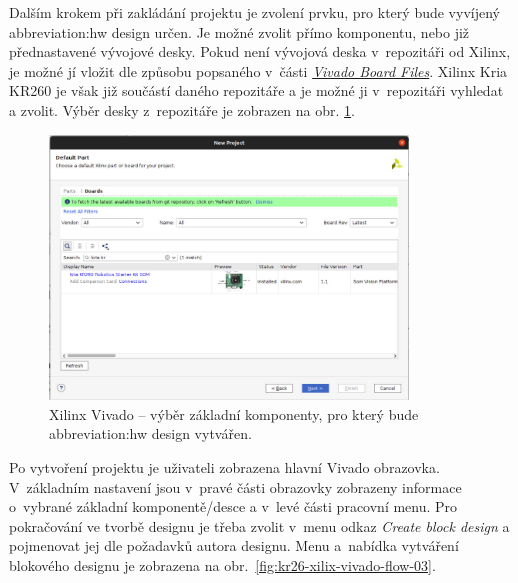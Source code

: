 \documentclass[a4paper, twoside, 11pt]{article}
\begin{document}
				Dalším krokem při zakládání projektu je zvolení prvku, pro který bude vyvíjený \gls{abbreviation:hw} design určen. Je možné zvolit přímo komponentu, nebo již přednastavené vývojové desky. Pokud není vývojová deska v~repozitáři od Xilinx, je možné jí vložit dle způsobu popsaného v~části \hyperref[subsec:vivado-board-files]{\textit{Vivado Board Files}}. Xilinx Kria KR260 je však již součástí daného repozitáře a je možné ji v~repozitáři vyhledat a zvolit. Výběr desky z~repozitáře je zobrazen na obr. \ref{fig:kr26-xilix-vivado-flow-02}.

				\begin{figure}[htbp!]
					\centering
					\includegraphics[width=0.85\textwidth]{src/png/kr26-xilinx-vivado-flow/kr26-xilix-vivado-flow-02.jpg}
					\caption{Xilinx Vivado – výběr základní komponenty, pro který bude \gls{abbreviation:hw} design vytvářen.}
					\label{fig:kr26-xilix-vivado-flow-02}
				\end{figure}

				Po vytvoření projektu je uživateli zobrazena hlavní Vivado obrazovka. V~základním nastavení jsou v~pravé části obrazovky zobrazeny informace o~vybrané základní komponentě/desce a v~levé části pracovní menu. Pro pokračování ve tvorbě designu je třeba zvolit v~menu odkaz \textit{Create block design} a pojmenovat jej dle požadavků autora designu. Menu a~nabídka vytváření blokového designu je zobrazena na obr.~\ref{fig:kr26-xilix-vivado-flow-03}.
		
\end{document}
